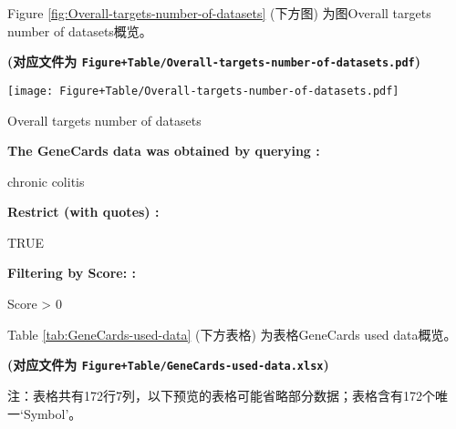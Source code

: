 \documentclass[
]{article}
\begin{document}
Figure \ref{fig:Overall-targets-number-of-datasets} (下方图) 为图Overall targets number of datasets概览。

\textbf{(对应文件为 \texttt{Figure+Table/Overall-targets-number-of-datasets.pdf})}

\def\@captype{figure}
\begin{center}
\texttt{[image: Figure+Table/Overall-targets-number-of-datasets.pdf]}
\caption{Overall targets number of datasets}\label{fig:Overall-targets-number-of-datasets}
\end{center}

\begin{center}\begin{tcolorbox}[colback=gray!10, colframe=gray!50, width=0.9\linewidth, arc=1mm, boxrule=0.5pt]
\textbf{
The GeneCards data was obtained by querying
:}

\vspace{0.5em}

    chronic colitis

\vspace{2em}


\textbf{
Restrict (with quotes)
:}

\vspace{0.5em}

    TRUE

\vspace{2em}


\textbf{
Filtering by Score:
:}

\vspace{0.5em}

    Score > 0

\vspace{2em}
\end{tcolorbox}
\end{center}

Table \ref{tab:GeneCards-used-data} (下方表格) 为表格GeneCards used data概览。

\textbf{(对应文件为 \texttt{Figure+Table/GeneCards-used-data.xlsx})}

\begin{center}\begin{tcolorbox}[colback=gray!10, colframe=gray!50, width=0.9\linewidth, arc=1mm, boxrule=0.5pt]注：表格共有172行7列，以下预览的表格可能省略部分数据；表格含有172个唯一`Symbol'。
\end{tcolorbox}
\end{center}
\end{document}
